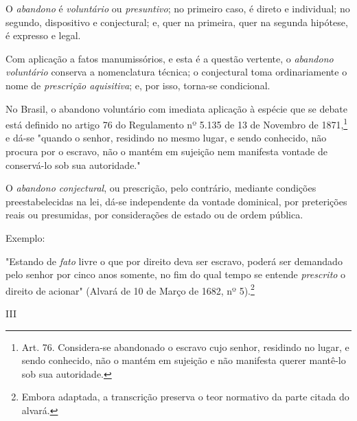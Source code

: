 O \emph{abandono} é \emph{voluntário} ou \emph{presuntivo}; no primeiro
caso, é direto e individual; no segundo, dispositivo e conjectural; e,
quer na primeira, quer na segunda hipótese, é expresso e legal.

Com aplicação a fatos manumissórios, e esta é a questão vertente, o
\emph{abandono voluntário} conserva a nomenclatura técnica; o
conjectural toma ordinariamente o nome de \emph{prescrição aquisitiva};
e, por isso, torna-se condicional.

No Brasil, o abandono voluntário com imediata aplicação à espécie que se
debate está definido no artigo 76 do Regulamento nº 5.135 de 13 de
Novembro de 1871,\footnote{Art. 76. Considera-se abandonado o escravo
  cujo senhor, residindo no lugar, e sendo conhecido, não o mantém em
  sujeição e não manifesta querer mantê-lo sob sua autoridade.} e dá-se
"quando o senhor, residindo no mesmo lugar, e sendo conhecido, não
procura por o escravo, não o mantém em sujeição nem manifesta vontade de
conservá-lo sob sua autoridade."

O \emph{abandono conjectural}, ou prescrição, pelo contrário, mediante
condições preestabelecidas na lei, dá-se independente da vontade
dominical, por preterições reais ou presumidas, por considerações de
estado ou de ordem pública.

Exemplo:

"Estando de \emph{fato} livre o que por direito deva ser escravo, poderá
ser demandado pelo senhor por cinco anos somente, no fim do qual tempo
se entende \emph{prescrito} o direito de acionar" (Alvará de 10 de Março
de 1682, nº 5).\footnote{Embora adaptada, a transcrição preserva o
  teor normativo da parte citada do alvará.}

III

